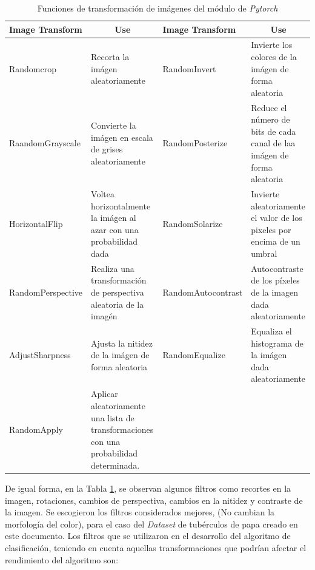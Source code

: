 \begin{table}[ht]
	\centering
	\begin{tabular}{|p{3.5cm}|p{3.5cm}|p{3.8cm}|p{3.5cm}|}
		\hline
		Image Transform       & \multicolumn{1}{c|}{Use}                                                               & Image Transform       & \multicolumn{1}{c|}{Use}                                                \\ \hline
		Randomcrop            & Recorta la imágen aleatoriamente                                                       & RandomInvert          & Invierte los colores de la imágen de forma aleatoria                    \\ \hline
		RaandomGrayscale      & Convierte la imágen en escala de grises aleatoriamente                                 & RandomPosterize       & Reduce el número de bits de cada canal de laa imágen de forma aleatoria \\ \hline
		HorizontalFlip  & Voltea horizontalmente la imágen al azar con una probabilidad dada                     & RandomSolarize        & Invierte aleatoriamente el valor de los pixeles por encima de un umbral \\ \hline
		RandomPerspective     & Realiza una transformación de perspectiva aleatoria de la imagén                       & RandomAutocontrast    & Autocontraste de los píxeles de la imagen dada aleatoriamente           \\ \hline
		AdjustSharpness & Ajusta la nitidez de la imágen de forma aleatoria                                      & RandomEqualize        & Equaliza el histograma de la imágen dada aleatoriamente                 \\ \hline
		RandomApply           & Aplicar aleatoriamente una lista de transformaciones con una probabilidad determinada. & \multicolumn{1}{l|}{} &                                                                         \\ \hline
	\end{tabular}				
	\caption{Funciones de transformación de imágenes del módulo de \textit{Pytorch}}
	\label{table:filters2}
\end{table}

\newpage
De igual forma, en la Tabla \ref{table:filters2}, se observan algunos filtros como recortes en la imagen, rotaciones, cambios de perspectiva, cambios en la nitidez y contraste de la imagen. Se escogieron los filtros considerados mejores, (No cambian la morfología del color), para el caso del \textit{Dataset} de tubérculos de papa creado en este documento. Los filtros que se utilizaron en el desarrollo del algoritmo de clasificación, teniendo en cuenta aquellas transformaciones que podrían afectar el rendimiento del algoritmo son:

